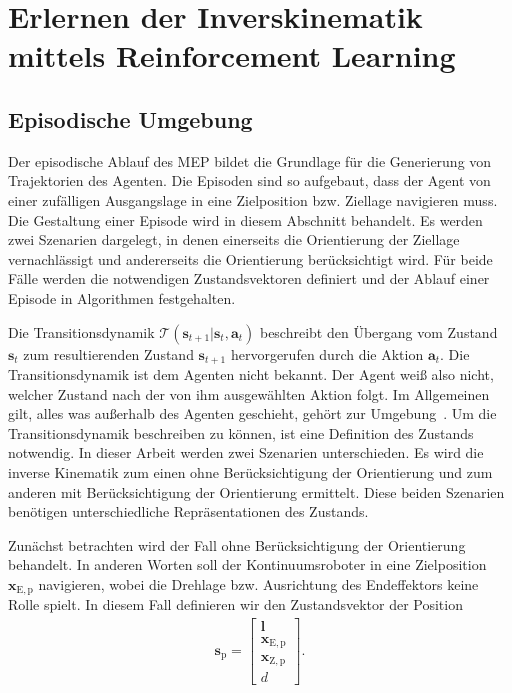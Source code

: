\chapter{Erlernen der Inverskinematik mittels Reinforcement Learning}
\label{ch:erlernen_inverskinematik}






\section{Episodische Umgebung}
\label{sec:umgebung_episode}

Der episodische Ablauf des MEP bildet die Grundlage für die Generierung von Trajektorien des Agenten. Die Episoden sind so aufgebaut, dass der Agent von einer zufälligen Ausgangslage in eine Zielposition bzw. Ziellage navigieren muss. Die Gestaltung einer Episode wird in diesem Abschnitt behandelt. Es werden zwei Szenarien dargelegt, in denen einerseits die Orientierung der Ziellage vernachlässigt und andererseits die Orientierung berücksichtigt wird. Für beide Fälle werden die notwendigen Zustandsvektoren definiert und der Ablauf einer Episode in Algorithmen festgehalten.
\newline

Die Transitionsdynamik $\mathcal{T}( \bm{s}_{t+1} | \bm{s}_t, \bm{a}_t)$ beschreibt den Übergang vom Zustand $\bm{s}_{t}$ zum resultierenden Zustand $\bm{s}_{t+1}$ hervorgerufen durch die Aktion $\bm{a}_t$. Die Transitionsdynamik ist dem Agenten nicht bekannt. Der Agent weiß also nicht, welcher Zustand nach der von ihm ausgewählten Aktion folgt. Im Allgemeinen gilt, alles was außerhalb des Agenten geschieht, gehört zur Umgebung~\cite{SB98}. Um die Transitionsdynamik beschreiben zu können, ist eine Definition des Zustands notwendig. In dieser Arbeit werden zwei Szenarien unterschieden. Es wird die inverse Kinematik zum einen ohne Berücksichtigung der Orientierung und zum anderen mit Berücksichtigung der Orientierung ermittelt. Diese beiden Szenarien benötigen unterschiedliche Repräsentationen des Zustands. 

Zunächst betrachten wird der Fall ohne Berücksichtigung der Orientierung behandelt. In anderen Worten soll der Kontinuumsroboter in eine Zielposition $\bm{x}_{\mathrm{E,p}}$ navigieren, wobei die Drehlage bzw. Ausrichtung des Endeffektors keine Rolle spielt. In diesem Fall definieren wir den Zustandsvektor der Position
\begin{align}
\bm{s}_{\mathrm{p}} = 
\begin{bmatrix}
\bm{l} \\ \bm{x}_{\mathrm{E,p}} \\ \bm{x}_{\mathrm{Z,p}} \\ d
\end{bmatrix}.
\label{eq:zustand_position}
\end{align}

